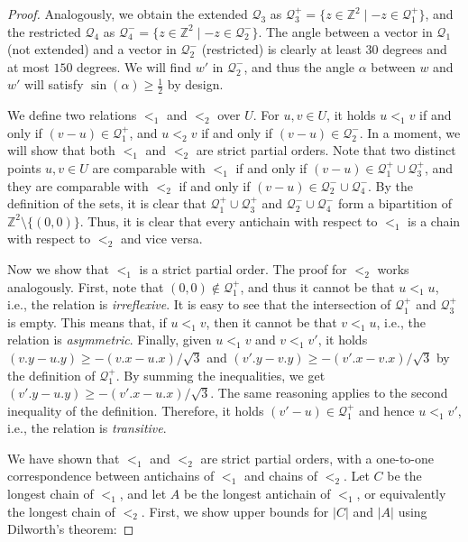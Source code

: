 \documentclass[twoside,leqno]{article}
\newcommand{\Q}{\mathcal{Q}}
\newcommand{\absolute}[1]{\left\lvert#1\right\rvert}
\begin{document}
\begin{proof}
%

%
Analogously, we obtain the extended $\Q_3$ as $\Q_3^+ = \{ z \in \mathbb Z^2 \mid -z \in \Q_1^+ \}$, and the restricted $\Q_4$ as $\Q_4^- = \{ z \in \mathbb Z^2 \mid -z \in \Q_2^- \}$. The angle between a vector in $\Q_1$ (not extended) and a vector in $\Q_2^-$ (restricted) is clearly at least $30$ degrees and at most $150$ degrees. We will find $w'$ in $\Q_2^-$, and thus the angle $\alpha$ between $w$ and $w'$ will satisfy $\sin(\alpha) \geq \frac12$ by design.

We define two relations $<_1$ and $<_2$ over $U$. For $u, v \in U$, it holds $u <_1 v$ if and only if $(v - u) \in \Q_1^+$, and $u <_2 v$ if and only if $(v - u) \in \Q_2^-$. In a moment, we will show that both $<_1$ and $<_2$ are strict partial orders. 
Note that two distinct points $u,v \in U$ are comparable with $<_1$ if and only if $(v - u) \in \Q_1^+ \cup \Q_3^+$, and they are comparable with $<_2$ if and only if $(v - u) \in \Q_2^- \cup \Q_4^-$. 
By the definition of the sets, it is clear that $\Q_1^+ \cup \Q_3^+$ and $\Q_2^- \cup \Q_4^-$ form a bipartition of $\mathbb Z^2 \setminus \{(0,0)\}$.
Thus, it is clear that every antichain with respect to $<_1$ is a chain with respect to $<_2$ and vice versa.

Now we show that $<_1$ is a strict partial order. The proof for $<_2$ works analogously. First, note that $(0,0) \notin \Q_1^+$, and thus it cannot be that $u <_1 u$, i.e., the relation is \emph{irreflexive}. It is easy to see that the intersection of $\Q_1^+$ and $\Q_3^+$ is empty. This means that, if $u <_1 v$, then it cannot be that $v <_1 u$, i.e., the relation is \emph{asymmetric}. Finally, given $u <_1 v$ and $v <_1 v'$, it holds $(v.y - u.y) \geq -(v.x-u.x)/\sqrt{3}$ and $(v'.y - v.y) \geq -(v'.x-v.x)/\sqrt{3}$ by the definition of $\Q_1^+$. By summing the inequalities, we get $(v'.y - u.y) \geq -(v'.x-u.x)/\sqrt{3}$. The same reasoning applies to the second inequality of the definition. Therefore, it holds $(v' - u) \in \Q_1^+$ and hence $u <_1 v'$, i.e., the relation is \emph{transitive}.

We have shown that $<_1$ and $<_2$ are strict partial orders, with a one-to-one correspondence between antichains of $<_1$ and chains of $<_2$.
Let $C$ be the longest chain of $<_1$, and let $A$ be the longest antichain of $<_1$, or equivalently the longest chain of $<_2$. First, we show upper bounds for $\absolute{C}$ and $\absolute{A}$ using Dilworth's theorem:


\end{proof}
\end{document}
